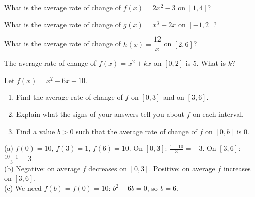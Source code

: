 \begin{exo}{}
What is the average rate of change of $f(x)=2x^2-3$ on $[1,4]$?
\end{exo}
\begin{exo}{}
What is the average rate of change of $g(x)=x^3-2x$ on $[-1,2]$?
\end{exo}
\begin{exo}{}
What is the average rate of change of $h(x)=\dfrac{12}{x}$ on $[2,6]$?
\end{exo}
\begin{exo}{}
The average rate of change of $f(x)=x^2+kx$ on $[0,2]$ is $5$. What is $k$?
\end{exo}
\begin{exo}{}
Let $f(x)=x^2-6x+10$.
\begin{enumerate}[label=(\alph*)]
\item Find the average rate of change of $f$ on $[0,3]$ and on $[3,6]$.
\item Explain what the signs of your answers tell you about $f$ on each interval.
\item Find a value $b>0$ such that the average rate of change of $f$ on $[0,b]$ is $0$.
\end{enumerate}
\begin{solution}
(a) $f(0)=10$, $f(3)=1$, $f(6)=10$. On $[0,3]$: $\frac{1-10}{3}=-3$. On $[3,6]$: $\frac{10-1}{3}=3$.\\
(b) Negative: on average $f$ decreases on $[0,3]$. Positive: on average $f$ increases on $[3,6]$.\\
(c) We need $f(b)=f(0)=10$: $b^2-6b=0$, so $b=6$.
\end{solution}
\end{exo}

